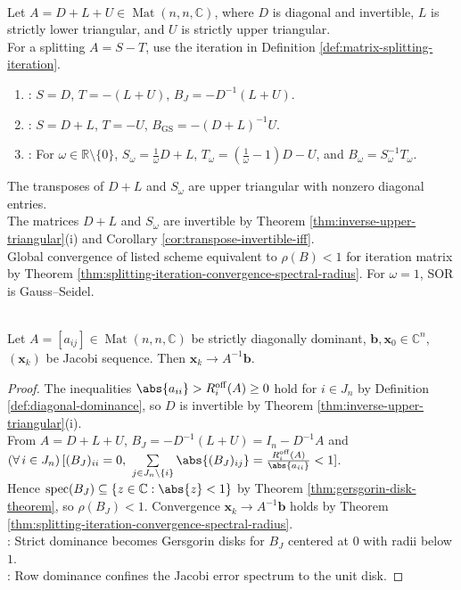 \begin{computationmethod} \label{meth:jacobi-gauss-seidel-sor-splittings} \\
Let $A=D+L+U\in\operatorname{Mat}(n,n,\mathbb{C})$, where $D$ is diagonal and invertible, $L$ is strictly lower triangular, and $U$ is strictly upper triangular.\\
For a splitting $A=S-T$, use the iteration in Definition \ref{def:matrix-splitting-iteration}.
\begin{enumerate}[label=(\roman*)]
\setlength{\itemsep}{0pt}
\item {}: $S=D$, $T=-(L+U)$, $B_J=-D^{-1}(L+U)$.
\item {}: $S=D+L$, $T=-U$, $B_{\operatorname{GS}}=-(D+L)^{-1}U$.
\item {}: For $\omega\in\mathbb{R}\setminus\{0\}$, $S_\omega=\frac{1}{\omega}D+L$, $T_\omega=\left(\frac{1}{\omega}-1\right)D-U$, and $B_\omega=S_\omega^{-1}T_\omega$.
\end{enumerate}
The transposes of $D+L$ and $S_\omega$ are upper triangular with nonzero diagonal entries.\\
The matrices $D+L$ and $S_\omega$ are invertible by Theorem \ref{thm:inverse-upper-triangular}(i) and Corollary \ref{cor:transpose-invertible-iff}.\\
Global convergence of listed scheme equivalent to $\rho(B)<1$ for iteration matrix by Theorem \ref{thm:splitting-iteration-convergence-spectral-radius}. For $\omega=1$, SOR is Gauss--Seidel.
\end{computationmethod}

\begin{corollary} \label{cor:strict-diagonal-dominance-jacobi-convergence} \\
Let $A=[a_{ij}]\in\operatorname{Mat}(n,n,\mathbb{C})$ be strictly diagonally dominant, $\mathbf{b},\mathbf{x}_0\in\mathbb{C}^n$, $(\mathbf{x}_k)$ be Jacobi sequence. Then $\mathbf{x}_k\to A^{-1}\mathbf{b}$.
\begin{proof}
The inequalities $\abs{a_{ii}}>R_i^{\mathrm{off}}(A)\geq0$ hold for $i\in J_n$ by Definition \ref{def:diagonal-dominance}, so $D$ is invertible by Theorem \ref{thm:inverse-upper-triangular}(i).\\
From $A=D+L+U$, $B_J=-D^{-1}(L+U)=I_n-D^{-1}A$ and $(\forall\,i\in J_n)\,[(B_J)_{ii}=0,\ \sum\limits_{j\in J_n\setminus\{i\}}\abs{(B_J)_{ij}}=\frac{R_i^{\mathrm{off}}(A)}{\abs{a_{ii}}}<1]$.\\
Hence $\operatorname{spec}(B_J)\subseteq\{z\in\mathbb{C}:\abs{z}<1\}$ by Theorem \ref{thm:gersgorin-disk-theorem}, so $\rho(B_J)<1$. Convergence $\mathbf{x}_k\to A^{-1}\mathbf{b}$ holds by Theorem \ref{thm:splitting-iteration-convergence-spectral-radius}.\\
: Strict dominance becomes Gersgorin disks for $B_J$ centered at $0$ with radii below $1$.\\
: Row dominance confines the Jacobi error spectrum to the unit disk.
\end{proof}
\end{corollary}

